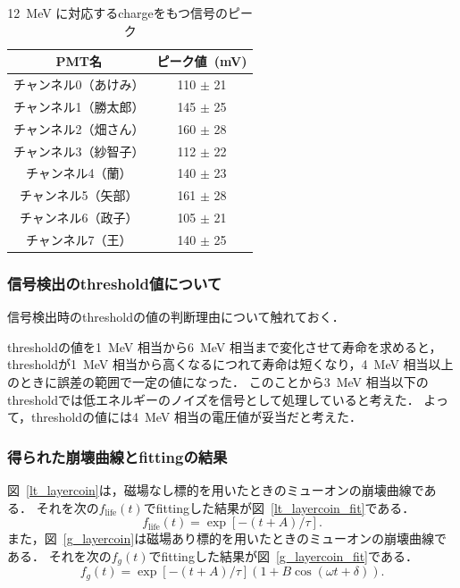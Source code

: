   \begin{table}[h]
   \caption{12~MeV に対応するchargeをもつ信号のピーク}
   \label{12MeVpeak}
  \begin{center}
   \begin{tabular}{cc}\toprule
    PMT名&ピーク値~(mV) \\ \hline
    チャンネル0（あけみ）&110 $\pm$ 21 \\
    チャンネル1（勝太郎）&145 $\pm$ 25 \\
    チャンネル2（畑さん）&160 $\pm$ 28 \\
    チャンネル3（紗智子）&112 $\pm$ 22 \\
    チャンネル4（蘭）  &140 $\pm$ 23 \\
    チャンネル5（矢部） &161 $\pm$ 28 \\
    チャンネル6（政子） &105 $\pm$ 21 \\
    チャンネル7（王）  &140 $\pm$ 25 \\ \bottomrule
   \end{tabular}
  \end{center} 
  \end{table}


  \subsubsection{信号検出のthreshold値について}
  信号検出時のthresholdの値の判断理由について触れておく．
  
  thresholdの値を1~MeV 相当から6~MeV 相当まで変化させて寿命を求めると，thresholdが1~MeV 相当から高くなるにつれて寿命は短くなり，4~MeV 相当以上のときに誤差の範囲で一定の値になった．
  このことから3~MeV 相当以下のthresholdでは低エネルギーのノイズを信号として処理していると考えた．
  よって，thresholdの値には4~MeV 相当の電圧値が妥当だと考えた．

  \subsubsection{得られた崩壊曲線とfittingの結果}
  図~\ref{lt_layercoin}は，磁場なし標的を用いたときのミューオンの崩壊曲線である．
  それを次の$f_{\mathrm{life}}(t)$でfittingした結果が図~\ref{lt_layercoin_fit}である．
  \begin{equation*}
   f_{\mathrm{life}}(t) = \exp[-(t+A)/\tau].
  \end{equation*}
  また，図~\ref{g_layercoin}は磁場あり標的を用いたときのミューオンの崩壊曲線である．
  それを次の$f_{g}(t)$でfittingした結果が図~\ref{g_layercoin_fit}である．
  \begin{equation*}
   f_{g}(t) = \exp[-(t+A)/\tau](1+B\cos(\omega t + \delta)).
  \end{equation*}
  
